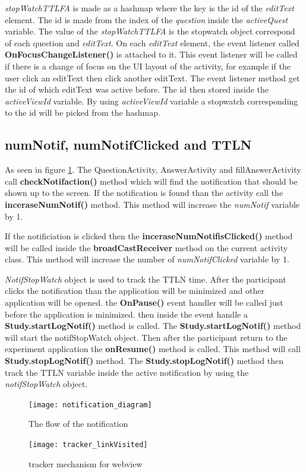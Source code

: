 \textit{stopWatchTTLFA} is made as a hashmap where the key is the id of the \textit{editText} element.
The id is made from the index of the \textit{question} inside the \textit{activeQuest} variable.
The value of the \textit{stopWatchTTLFA} is the stopwatch object correspond of each question and \textit{editText}.
On each \textit{editText} element, the event listener called \textbf{OnFocusChangeListener()} is attached to it. This event listener will be called if there is a
change of focus on the UI layout of the activity, for example if the user click an editText then click another editText. The event listener
 method get the id of which editText was active before. The id then stored inside the \textit{activeViewId} variable.
By using \textit{activeViewId} variable a stopwatch corresponding to the id will be picked from the hashmap.


\subsection{numNotif, numNotifClicked and TTLN}
As seen in figure \ref{fig:NotificationFlo}. The QuestionActivity, AnswerActivity and fillAnswerActivity  call \textbf{checkNotifaction()} method
which will find the notification that should be shown up to the screen. If the notification is found than the activity call the \textbf{inceraseNumNotif()} method.
This method will increase the \textit{numNotif} variable by 1.

If the notificiation is clicked then the \textbf{inceraseNumNotifisClicked()} method will be called inside the \textbf{broadCastReceiver} method on the current activity class.
This method will increase the number of \textit{numNotifClicked} variable by 1.

\textit{NotifStopWatch} object is used to track the TTLN time.
After the participant clicks the notification than the application will be minimized and other
application will be opened.
 the \textbf{OnPause()} event handler will be called just before the application is minimized.
then inside the event handle a \textbf{Study.startLogNotif()} method is called. The \textbf{Study.startLogNotif()}  method will start the notifStopWatch object.
Then after the participant return to the experiment application the \textbf{onResume()} method is called.
This method will call \textbf{Study.stopLogNotif()} method.
The \textbf{Study.stopLogNotif()} method then track the TTLN variable inside the active notification
by using the \textit{notifStopWatch} object.


\begin{figure}
\begin{center}
\texttt{[image: notification\_diagram]}
\end{center}
\caption{The flow of the notification}
\label{fig:NotificationFlo}
\end{figure}
%
\begin{figure}
\begin{center}
\texttt{[image: tracker\_linkVisited]}
\end{center}
\caption{tracker mechanism for webview}
\label{fig:webViewTrack}
\end{figure}
